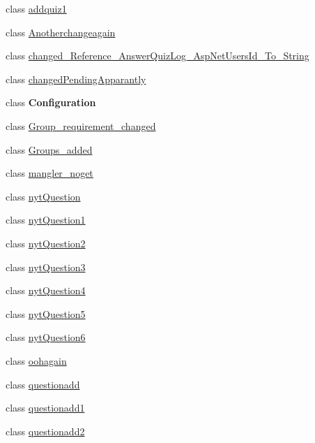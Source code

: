 \begin{DoxyCompactItemize}
\item 
class \hyperlink{class_website_1_1_migrations_1_1addquiz1}{addquiz1}
\item 
class \hyperlink{class_website_1_1_migrations_1_1_anotherchangeagain}{Anotherchangeagain}
\item 
class \hyperlink{class_website_1_1_migrations_1_1changed___reference___answer_quiz_log___asp_net_users_id___to___string}{changed\+\_\+\+Reference\+\_\+\+Answer\+Quiz\+Log\+\_\+\+Asp\+Net\+Users\+Id\+\_\+\+To\+\_\+\+String}
\item 
class \hyperlink{class_website_1_1_migrations_1_1changed_pending_apparantly}{changed\+Pending\+Apparantly}
\item 
class {\bfseries Configuration}
\item 
class \hyperlink{class_website_1_1_migrations_1_1_group__requirement__changed}{Group\+\_\+requirement\+\_\+changed}
\item 
class \hyperlink{class_website_1_1_migrations_1_1_groups__added}{Groups\+\_\+added}
\item 
class \hyperlink{class_website_1_1_migrations_1_1mangler__noget}{mangler\+\_\+noget}
\item 
class \hyperlink{class_website_1_1_migrations_1_1nyt_question}{nyt\+Question}
\item 
class \hyperlink{class_website_1_1_migrations_1_1nyt_question1}{nyt\+Question1}
\item 
class \hyperlink{class_website_1_1_migrations_1_1nyt_question2}{nyt\+Question2}
\item 
class \hyperlink{class_website_1_1_migrations_1_1nyt_question3}{nyt\+Question3}
\item 
class \hyperlink{class_website_1_1_migrations_1_1nyt_question4}{nyt\+Question4}
\item 
class \hyperlink{class_website_1_1_migrations_1_1nyt_question5}{nyt\+Question5}
\item 
class \hyperlink{class_website_1_1_migrations_1_1nyt_question6}{nyt\+Question6}
\item 
class \hyperlink{class_website_1_1_migrations_1_1oohagain}{oohagain}
\item 
class \hyperlink{class_website_1_1_migrations_1_1questionadd}{questionadd}
\item 
class \hyperlink{class_website_1_1_migrations_1_1questionadd1}{questionadd1}
\item 
class \hyperlink{class_website_1_1_migrations_1_1questionadd2}{questionadd2}
\item 

\end{DoxyCompactItemize}
